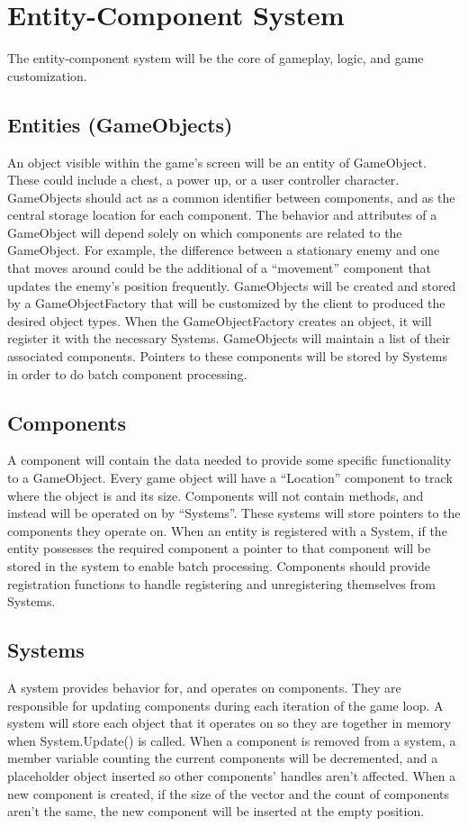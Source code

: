 \documentclass[12pt]{article}
\begin{document}
\section{Entity-Component System}
The entity-component system will be the core of gameplay, logic, and game customization.  

\subsection{Entities (GameObjects)}
An object visible within the game's screen will be an entity of GameObject.  These could include a chest, a power up, or a user controller character.  GameObjects should act as a common identifier between components, and as the central storage location for each component.  The behavior and attributes of a GameObject will depend solely on which components are related to the GameObject.  For example, the difference between a stationary enemy and one that moves around could be the additional of a ``movement'' component that updates the enemy's position frequently.  GameObjects will be created and stored by a GameObjectFactory that will be customized by the client to produced the desired object types.  When the GameObjectFactory creates an object, it will register it with the necessary Systems.  GameObjects will maintain a list of their associated components.  Pointers to these components will be stored by Systems in order to do batch component processing.    

\subsection{	Components}
A component will contain the data needed to provide some specific functionality to a GameObject.  Every game object will have a ``Location'' component to track where the object is and its size.  Components will not contain methods, and instead will be operated on by ``Systems''.  These systems will store pointers to the components they operate on.  When an entity is registered with a System, if the entity possesses the required component a pointer to that component will be stored in the system to enable batch processing. Components should provide registration functions to handle registering and unregistering themselves from Systems.

\subsection{	Systems} 
A system provides behavior for, and operates on components.  They are responsible for updating components during each iteration of the game loop.  A system will store each object that it operates on so they are together in memory when System.Update() is called.  When a component is removed from a system, a member variable counting the current components will be decremented, and a placeholder object inserted so other components' handles aren't affected.  When a new component is created, if the size of the vector and the count of components aren't the same, the new component will be inserted at the empty position.  
\end{document}
